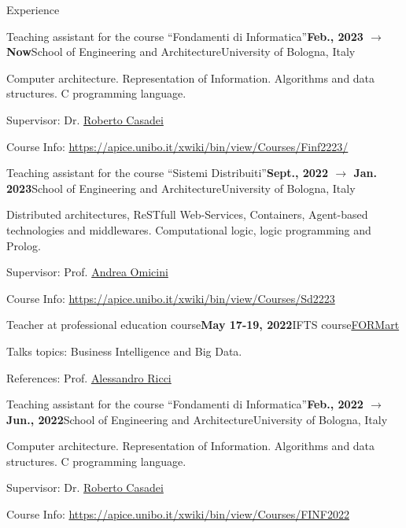 \documentclass{resume} %
\begin{document}
    \begin{rSection}{Experience}
        
        \begin{rSubsection}{Teaching assistant for the course ``Fondamenti di Informatica''}{\textbf{Feb., 2023 $\rightarrow$ Now}}{School of Engineering and Architecture}{University of Bologna, Italy}
            \item Computer architecture. Representation of Information. Algorithms and data structures. C programming language.
            \item Supervisor: Dr. \href{mailto:roberto.casadei@unibo.it}{Roberto Casadei}
            \item Course Info: \url{https://apice.unibo.it/xwiki/bin/view/Courses/Finf2223/}
        \end{rSubsection}
        
        \begin{rSubsection}{Teaching assistant for the course ``Sistemi Distribuiti''}{\textbf{Sept., 2022 $\rightarrow$ Jan. 2023}}{School of Engineering and Architecture}{University of Bologna, Italy}
            \item Distributed architectures, ReSTfull Web-Services, Containers, Agent-based technologies and middlewares. Computational logic, logic programming and Prolog.
            \item Supervisor: Prof. \href{mailto:andrea.omicini@unibo.it}{Andrea Omicini}
            \item Course Info: \url{https://apice.unibo.it/xwiki/bin/view/Courses/Sd2223}
        \end{rSubsection}
        
        \begin{rSubsection}{Teacher at professional education course}{\textbf{May 17-19, 2022}}{IFTS course}{\href{http://www.formart.it/home}{FORMart}}
            \item Talks topics: Business Intelligence and Big Data.
            \item References:  Prof. \href{mailto:a.ricci@unibo.it}{Alessandro Ricci}
        \end{rSubsection}
        
        \begin{rSubsection}{Teaching assistant for the course ``Fondamenti di Informatica''}{\textbf{Feb., 2022 $\rightarrow$ Jun., 2022}}{School of Engineering and Architecture}{University of Bologna, Italy}
            \item Computer architecture. Representation of Information. Algorithms and data structures. C programming language.
            \item Supervisor: Dr. \href{mailto:roberto.casadei@unibo.it}{Roberto Casadei}
            \item Course Info: \url{https://apice.unibo.it/xwiki/bin/view/Courses/FINF2022}
        \end{rSubsection}
        

\end{rSection}
\end{document}
